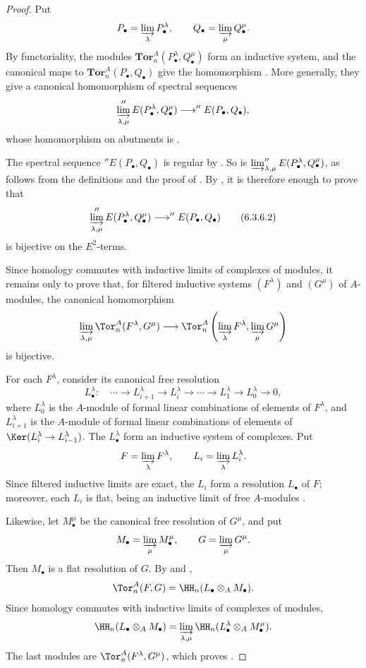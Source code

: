 \begin{proof}
Put
\[
  P_\bullet=\varinjlim_\lambda P_\bullet^\lambda,
  \qquad
  Q_\bullet=\varinjlim_\mu Q_\bullet^\mu.
\]
By functoriality, the modules
$\mathbf{Tor}_n^A(P_\bullet^\lambda,Q_\bullet^\mu)$ form an
inductive system, and the canonical maps to
$\mathbf{Tor}_n^A(P_\bullet,Q_\bullet)$ give the homomorphism
.  More generally, they give a canonical
homomorphism of spectral sequences
\[
  \varinjlim_{\lambda,\mu}
  ''E(P_\bullet^\lambda,Q_\bullet^\mu)
  \longrightarrow
  ''E(P_\bullet,Q_\bullet),
\]
whose homomorphism on abutments is .

The spectral sequence $''E(P_\bullet,Q_\bullet)$ is regular by
.  So is
$\varinjlim_{\lambda,\mu}''E(P_\bullet^\lambda,Q_\bullet^\mu)$,
as follows from the definitions  and the proof
of .  By , it is therefore
enough to prove that
\[
  \varinjlim_{\lambda,\mu}
  ''E(P_\bullet^\lambda,Q_\bullet^\mu)
  \longrightarrow
  ''E(P_\bullet,Q_\bullet)
  \tag{6.3.6.2}\label{III.6.3.6.2}
\]
is bijective on the $E^2$-terms.

Since homology commutes with inductive limits of complexes of
modules, it remains only to prove that, for filtered inductive
systems $(F^\lambda)$ and $(G^\mu)$ of $A$-modules, the canonical
homomorphism
\[
  \varinjlim_{\lambda,\mu}\Tor_n^A(F^\lambda,G^\mu)
  \longrightarrow
  \Tor_n^A\left(
    \varinjlim_\lambda F^\lambda,
    \varinjlim_\mu G^\mu
  \right)
\]
is bijective.

For each $F^\lambda$, consider its canonical free resolution
\[
  L_\bullet^\lambda:\quad
  \cdots\longrightarrow L_{i+1}^\lambda
  \longrightarrow L_i^\lambda
  \longrightarrow\cdots\longrightarrow
  L_1^\lambda\longrightarrow L_0^\lambda\longrightarrow0,
\]
where $L_0^\lambda$ is the $A$-module of formal linear
combinations of elements of $F^\lambda$, and
$L_{i+1}^\lambda$ is the $A$-module of formal linear combinations
of elements of
$\Ker(L_i^\lambda\to L_{i-1}^\lambda)$.  The
$L_\bullet^\lambda$ form an inductive system of complexes.  Put
\[
  F=\varinjlim_\lambda F^\lambda,
  \qquad
  L_i=\varinjlim_\lambda L_i^\lambda.
\]
Since filtered inductive limits are exact, the $L_i$ form a
resolution $L_\bullet$ of $F$; moreover, each $L_i$ is flat, being
an inductive limit of free $A$-modules .

Likewise, let $M_\bullet^\mu$ be the canonical free resolution of
$G^\mu$, and put
\[
  M_\bullet=\varinjlim_\mu M_\bullet^\mu,
  \qquad
  G=\varinjlim_\mu G^\mu.
\]
Then $M_\bullet$ is a flat resolution of $G$.  By
 and ,
\[
  \Tor_n^A(F,G)=\HH_n(L_\bullet\otimes_AM_\bullet).
\]
Since homology commutes with inductive limits of complexes of
modules,
\[
  \HH_n(L_\bullet\otimes_AM_\bullet)
  =
  \varinjlim_{\lambda,\mu}
  \HH_n(L_\bullet^\lambda\otimes_AM_\bullet^\mu).
\]
The last modules are $\Tor_n^A(F^\lambda,G^\mu)$, which proves
.


\end{proof}
